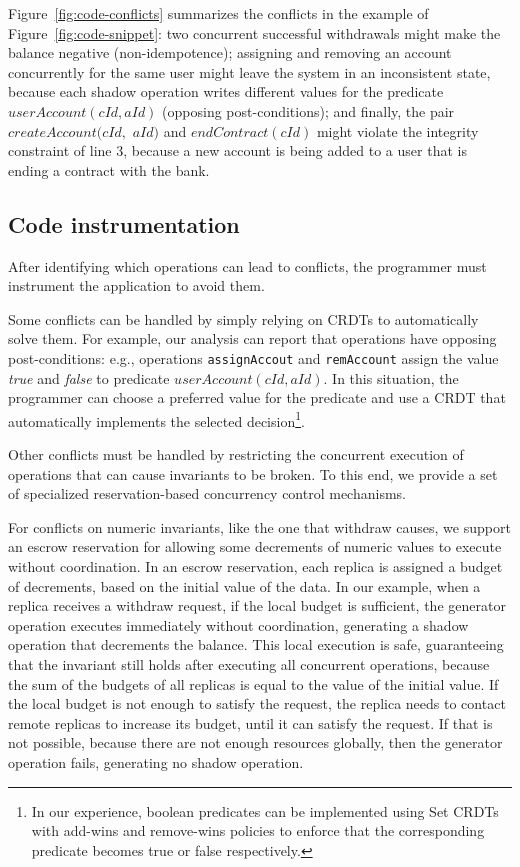 \documentclass[11pt]{article}
\begin{document}
Figure~\ref{fig:code-conflicts} summarizes the conflicts in the example
of Figure~\ref{fig:code-snippet}:
two concurrent successful withdrawals might make the balance negative
(non-idempotence);
assigning and removing an account concurrently for the same user might leave
the system in an inconsistent state, because each shadow operation writes different
values for the predicate $userAccount(cId, aId)$ (opposing post-conditions);
and finally, the pair $createAccount(cId,$ $ aId)$ and $endContract(cId)$ might
violate the integrity constraint of line 3, because a new account is being
added to a user that is ending a contract with the bank.


\subsection{Code instrumentation}
After identifying which operations can lead to conflicts, the programmer
must instrument the application to avoid them.

Some conflicts can be handled by simply relying on CRDTs to automatically solve
them.
For example, our analysis can report that operations have
opposing post-conditions: e.g., operations {\tt assignAccout} and {\tt remAccount}
assign the value \textit{true} and \textit{false} to predicate $userAccount(cId, aId)$.
In this situation, the programmer can choose a preferred value for the
predicate and use a CRDT that automatically implements the selected
decision\footnote{In our
experience, boolean predicates can be implemented using Set CRDTs with
add-wins and remove-wins policies to enforce that the corresponding
predicate becomes true or false
respectively.}.

Other conflicts must be handled by restricting the concurrent execution of
operations that can cause invariants to be broken. To this end, we provide a set
of specialized reservation-based concurrency control mechanisms.

For conflicts on numeric invariants, like the one that withdraw causes,
we support an escrow reservation for allowing some decrements of numeric
values to execute without coordination.
In an escrow reservation, each replica is assigned a budget of decrements,
based on the initial value of the data.
In our example, when a replica receives a withdraw request, if the local
budget is sufficient, the generator operation executes immediately
without coordination, generating a shadow operation that decrements
the balance.
This local execution is safe, guaranteeing that the invariant still holds
after executing all concurrent operations, because the sum
of the budgets of all replicas is equal to the value of the initial value.
If the local budget is not enough to satisfy the request, the replica needs to
contact remote replicas to increase its budget, until it can satisfy the request.
If that is not possible, because there are not enough resources globally,
then the generator operation fails, generating no shadow operation.
\end{document}
